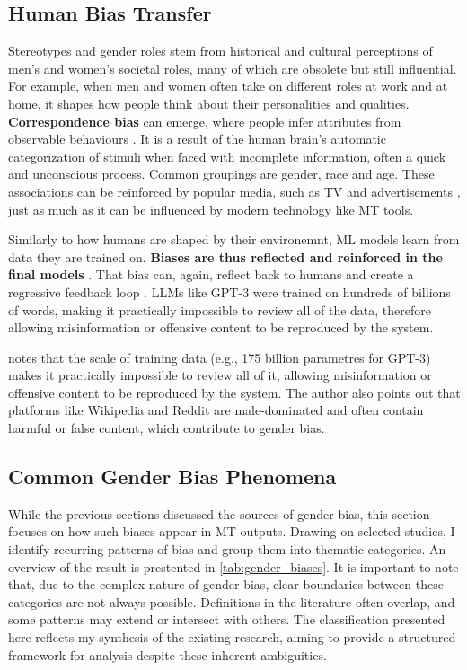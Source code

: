 \subsection{Human Bias Transfer}
Stereotypes and gender roles stem from historical and cultural perceptions of men's and women's societal roles, many of which are obsolete but still influential. For example, when men and women often take on different roles at work and at home, it shapes how people think about their personalities and qualities. \textbf{Correspondence bias} can emerge, where people infer attributes from observable behaviours \citep{godsilEffectsGenderRoles2016}. It is a result of the human brain's automatic categorization of stimuli when faced with incomplete information, often a quick and unconscious process. Common groupings are gender, race and age. These associations can be reinforced by popular media, such as TV and advertisements \citep{godsilEffectsGenderRoles2016}, just as much as it can be influenced by modern technology like MT tools. 

Similarly to how humans are shaped by their environemnt, ML models learn from data they are trained on. \textbf{Biases are thus reflected and reinforced in the final models} \citep{stanczakSurveyGenderBias2021,smacchiaDoesAIReflect2024}. That bias can, again, reflect back to humans and create a regressive feedback loop \citep{barclayInvestigatingMarkersDrivers2024a,shresthaExploringGenderBiases2022}. LLMs like GPT-3 were trained on hundreds of billions of words, making it practically impossible to review all of the data, therefore allowing misinformation or offensive content to be reproduced by the system.

\citet{ullmannGenderBiasMachine2022} notes that the scale of training data (e.g., 175 billion parametres for GPT-3) makes it practically impossible to review all of it, allowing misinformation or offensive content to be reproduced by the system. The author also points out that platforms like Wikipedia and Reddit are male-dominated and often contain harmful or false content, which contribute to gender bias.

\subsection{Common Gender Bias Phenomena}
While the previous sections discussed the sources of gender bias, this section focuses on how such biases appear in MT outputs. Drawing on selected studies, I identify recurring patterns of bias and group them into thematic categories. An overview of the result is prestented in \autoref{tab:gender_biases}. It is important to note that, due to the complex nature of gender bias, clear boundaries between these categories are not always possible. Definitions in the literature often overlap, and some patterns may extend or intersect with others. The classification presented here reflects my synthesis of the existing research, aiming to provide a structured framework for analysis despite these inherent ambiguities.


